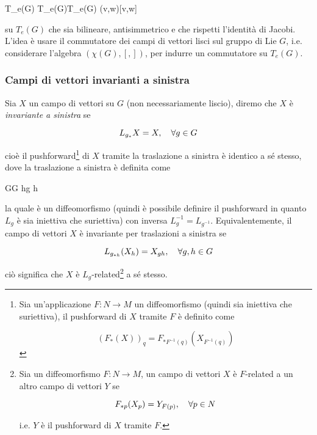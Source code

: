 \map{[,]}%
	{T_{e}(G) \times T_{e}(G)}{T_{e}(G)}%
	{(v,w)}{[v,w]}

su $ T_{e}(G) $ che sia bilineare, antisimmetrico e che rispetti l'identità di Jacobi.\\
L'idea è usare il commutatore dei campi di vettori lisci sul gruppo di Lie $ G $, i.e. considerare l'algebra $ (\chi(G),[,]) $, per indurre un commutatore su $ T_{e}(G) $.

\subsubsection{Campi di vettori invarianti a sinistra}

Sia $ X $ un campo di vettori su $ G $ (non necessariamente liscio), diremo che $ X $ è \textit{invariante a sinistra} se

\begin{equation}
	L_{g_{*}} X = X \qcomma \forall g \in G
\end{equation}

cioè il pushforward\footnote{%
	Sia un'applicazione $ F : N \to M $ un diffeomorfismo (quindi sia iniettiva che suriettiva), il pushforward di $ X $ tramite $ F $ è definito come

	\begin{equation*}
		(F_{*} (X))_{q} = F_{*F^{-1}(q)} (X_{F^{-1}(q)})
	\end{equation*}%
} di $ X $ tramite la traslazione a sinistra è identico a sé stesso, dove la traslazione a sinistra è definita come

%
	{G}{G}%
	{h}{g h}

la quale è un diffeomorfismo (quindi è possibile definire il pushforward in quanto $ L_{g} $ è sia iniettiva che suriettiva) con inversa $ L_{g}^{-1} = L_{g^{-1}} $. Equivalentemente, il campo di vettori $ X $ è invariante per traslazioni a sinistra se

\begin{equation}
	L_{g_{*h}} (X_{h}) = X_{gh} \qcomma \forall g,h \in G
\end{equation}

ciò significa che $ X $ è $ L_{g} $-related\footnote{%
	Sia un diffeomorfismo $ F : N \to M $, un campo di vettori $ X $ è $ F $-related a un altro campo di vettori $ Y $ se
	
	\begin{equation*}
		F_{*p}(X_{p}) = Y_{F(p)} \qcomma \forall p \in N
	\end{equation*}

	i.e. $ Y $ è il pushforward di $ X $ tramite $ F $.%
} a sé stesso.

